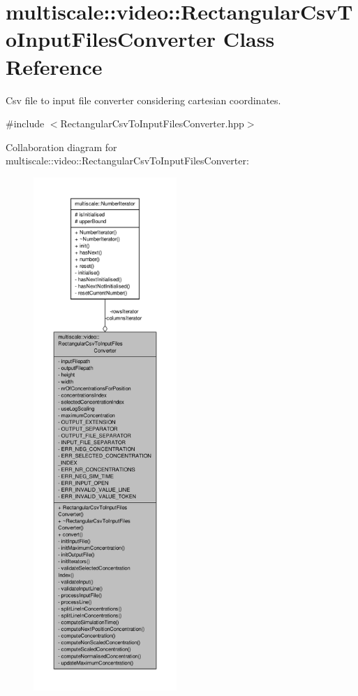 \hypertarget{classmultiscale_1_1video_1_1RectangularCsvToInputFilesConverter}{\section{multiscale\-:\-:video\-:\-:Rectangular\-Csv\-To\-Input\-Files\-Converter Class Reference}
\label{classmultiscale_1_1video_1_1RectangularCsvToInputFilesConverter}
}


Csv file to input file converter considering cartesian coordinates.  




{\ttfamily \#include $<$Rectangular\-Csv\-To\-Input\-Files\-Converter.\-hpp$>$}



Collaboration diagram for multiscale\-:\-:video\-:\-:Rectangular\-Csv\-To\-Input\-Files\-Converter\-:\nopagebreak
\begin{figure}[H]
\begin{center}
\leavevmode
\includegraphics[height=550pt]{classmultiscale_1_1video_1_1RectangularCsvToInputFilesConverter__coll__graph}
\end{center}
\end{figure}
